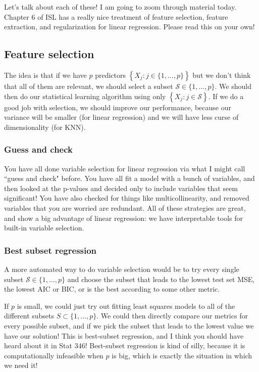 Let's talk about each of these! I am going to zoom through material today. Chapter 6 of ISL has a really nice treatment of feature selection, feature extraction, and regularization for linear regression. Please read this on your own!

\normalsize

\subsection{Feature selection}

The idea is that if we have $p$ predictors $\left\{X_j : j \in \{1,\ldots,p\}\right\}$ but we don't think that all of them are relevant, we should select a subset $\mathcal{S} \in \{1,\ldots,p\}$. We should then do our statistical learning algorithm using only $\left\{X_j : j \in \mathcal{S} \right\}$. If we do a good job with selection, we should improve our performance, because our variance will be smaller (for linear regression) and we will have less curse of dimensionality (for KNN).

\subsubsection{Guess and check}

You have all done variable selection for linear regression via what I might call ``guess and check" before. You have all fit a model with a bunch of variables, and then looked at the p-values and decided only to include variables that seem significant! You have also checked for things like multicollinearity, and removed variables that you are worried are redundant. All of these strategies are great, and show a big advantage of linear regression: we have interpretable tools for built-in variable selection. 

\subsubsection{Best subset regression}

A more automated way to do variable selection would be to try every single subset $\mathcal{S} \in \{1,\ldots,p\}$ and choose the subset that leads to the lowest test set MSE, the lowest AIC or BIC, or is the best according to some other metric.

If $p$ is small, we could just try out fitting least squares models to all of the different subsets $S \subset \{1,\ldots,p\}$. We could then directly compare our metrics for every possible subset, and if we pick the subset that leads to the lowest value we have our solution! This is best-subset regression, and I think you should have heard about it in Stat 346! Best-subset regression is kind of silly, because it is computationally infeasible when $p$ is big, which is exactly the situation in which we need it! 


